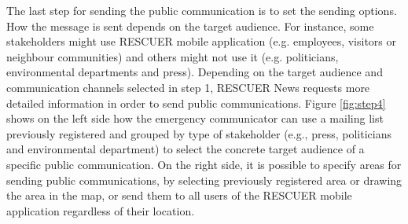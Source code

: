 
The last step for sending the public communication is to set the sending options. How the message is sent depends on the target audience. For instance, some stakeholders might use RESCUER mobile application (e.g. employees, visitors or neighbour communities) and others might not use it (e.g. politicians, environmental departments and press). Depending on the target audience and communication channels selected in step 1, RESCUER News requests more detailed information in order to send public communications. Figure \ref{fig:step4} shows on the left side how the emergency communicator can use a mailing list previously registered and grouped by type of stakeholder (e.g.,
press, politicians and environmental department) to select the concrete target audience of a specific public communication. On the right side, it is possible to specify areas for sending public communications, by selecting previously registered area or drawing the area in the map, or send them to all users of the RESCUER mobile application regardless of their location.